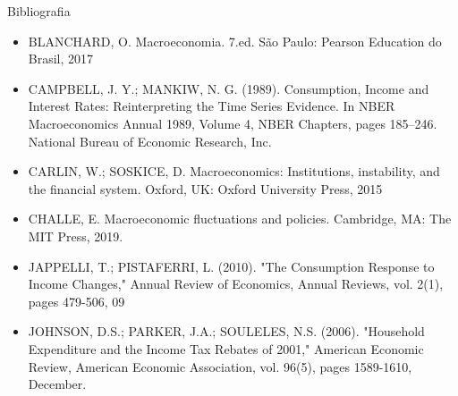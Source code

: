 \documentclass[10pt]{beamer}
\begin{document}
\begin{frame}{ Bibliografia}
    \begin{itemize}
        \item BLANCHARD, O. Macroeconomia. 7.ed. São Paulo: Pearson Education do Brasil, 2017\medskip        
        \item CAMPBELL, J. Y.; MANKIW, N. G. (1989). Consumption, Income and Interest Rates: Reinterpreting the Time Series Evidence. In NBER Macroeconomics Annual 1989, Volume 4, NBER
        Chapters, pages 185–246. National Bureau of Economic Research, Inc.        
        \item CARLIN, W.; SOSKICE, D. Macroeconomics: Institutions, instability, and the financial system. Oxford, UK: Oxford University Press, 2015\medskip
        \item CHALLE, E. Macroeconomic fluctuations and policies. Cambridge, MA: The MIT Press, 2019.
        \item JAPPELLI, T.; PISTAFERRI, L. (2010). "The Consumption Response to Income Changes," Annual Review of Economics, Annual Reviews, vol. 2(1), pages 479-506, 09\medskip
        \item JOHNSON, D.S.; PARKER, J.A.; SOULELES, N.S. (2006). "Household Expenditure and the Income Tax Rebates of 2001," American Economic Review, American Economic Association, vol. 96(5), pages 1589-1610, December.
    \end{itemize}
\end{frame}
\end{document}
